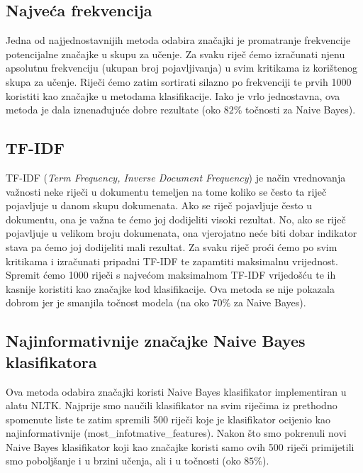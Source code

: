 \documentclass[conference]{IEEEtran}
\begin{document}
\subsection{Najveća frekvencija}

Jedna od najjednostavnijih metoda odabira značajki je promatranje frekvencije potencijalne značajke u skupu za učenje. Za svaku riječ ćemo izračunati njenu apsolutnu frekvenciju (ukupan broj pojavljivanja) u svim kritikama iz korištenog skupa za učenje. Riječi ćemo zatim sortirati silazno po frekvenciji te prvih 1000 koristiti kao značajke u metodama klasifikacije. Iako je vrlo jednostavna, ova metoda je dala iznenađujuće dobre rezultate (oko $82\%$ točnosti za Naive Bayes).

\subsection{TF-IDF}

TF-IDF (\textit{Term Frequency, Inverse Document Frequency}) je način vrednovanja važnosti neke riječi u dokumentu temeljen na tome koliko se često ta riječ pojavljuje u danom skupu dokumenata. Ako se riječ pojavljuje često u dokumentu, ona je važna te ćemo joj dodijeliti visoki rezultat. No, ako se riječ pojavljuje u velikom broju dokumenata, ona vjerojatno neće biti dobar indikator stava pa ćemo joj dodijeliti mali rezultat. Za svaku riječ proći ćemo po svim kritikama i izračunati pripadni TF-IDF te zapamtiti maksimalnu vrijednost. Spremit ćemo 1000 riječi s najvećom maksimalnom TF-IDF vrijedošću te ih kasnije koristiti kao značajke kod klasifikacije. Ova metoda se nije pokazala dobrom jer je smanjila točnost modela (na oko $70\%$ za Naive Bayes).

\subsection{Najinformativnije značajke Naive Bayes klasifikatora}

Ova metoda odabira značajki koristi Naive Bayes klasifikator implementiran u alatu NLTK. Najprije smo naučili klasifikator na svim riječima iz prethodno spomenute liste te zatim spremili 500 riječi koje je klasifikator ocijenio kao najinformativnije (most\_infotmative\_features). Nakon što smo pokrenuli novi Naive Bayes klasifikator koji kao značajke koristi samo ovih 500 riječi primijetili smo poboljšanje i u brzini učenja, ali i u točnosti (oko $85\%$).
\end{document}
